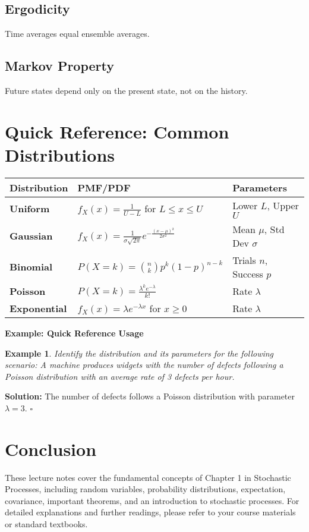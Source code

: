 \documentclass[12pt]{article}
\newtheorem{example}{Example}
\newenvironment{solution}{\noindent\textbf{Solution:}}{\hfill$\square$}
\begin{document}
\subsection{Ergodicity}
Time averages equal ensemble averages.

\subsection{Markov Property}
Future states depend only on the present state, not on the history.

\section{Quick Reference: Common Distributions}
\begin{center}
\begin{tabular}{@{}lll@{}}
\toprule
\textbf{Distribution} & \textbf{PMF/PDF} & \textbf{Parameters} \\ \midrule
\textbf{Uniform} & \( f_X(x) = \frac{1}{U - L} \) for \( L \leq x \leq U \) & Lower \( L \), Upper \( U \) \\
\textbf{Gaussian} & \( f_X(x) = \frac{1}{\sigma \sqrt{2\pi}} e^{ -\frac{(x - \mu)^2}{2\sigma^2} } \) & Mean \( \mu \), Std Dev \( \sigma \) \\
\textbf{Binomial} & \( P(X = k) = \binom{n}{k} p^k (1-p)^{n-k} \) & Trials \( n \), Success \( p \) \\
\textbf{Poisson} & \( P(X = k) = \frac{\lambda^k e^{-\lambda}}{k!} \) & Rate \( \lambda \) \\
\textbf{Exponential} & \( f_X(x) = \lambda e^{-\lambda x} \) for \( x \geq 0 \) & Rate \( \lambda \) \\ \bottomrule
\end{tabular}
\end{center}

\textbf{Example: Quick Reference Usage}
\begin{example}
Identify the distribution and its parameters for the following scenario:
A machine produces widgets with the number of defects following a Poisson distribution with an average rate of 3 defects per hour.
\end{example}
\begin{solution}
The number of defects follows a Poisson distribution with parameter \( \lambda = 3 \).
\end{solution}

\section{Conclusion}
These lecture notes cover the fundamental concepts of Chapter 1 in Stochastic Processes, including random variables, probability distributions, expectation, covariance, important theorems, and an introduction to stochastic processes. For detailed explanations and further readings, please refer to your course materials or standard textbooks.
\end{document}
